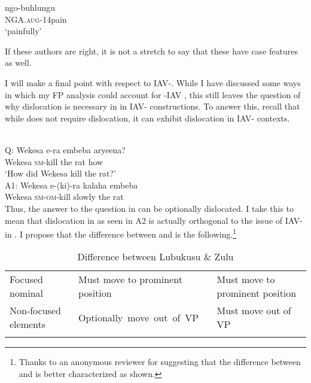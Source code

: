 \documentclass[output=paper,newtxmath,modfonts,nonflat,hidelinks]{langsci/langscibook}
\begin{document}
\ex\label{ex:selvanathan:17b}
\gll ngo-buhlungu\\
NGA.\textsc{aug}{}-14pain\\
\glt `painfully'
\z
\z

If these authors are right, it is not a stretch to say that these have case features as well. 

I will make a final point with respect to  IAV-. While I have discussed some ways in which my FP analysis could account for -IAV , this still leaves the question of why dislocation is necessary in  in IAV- constructions. To answer this, recall that while  does not require dislocation, it can exhibit dislocation in IAV- contexts.

\newpage 
\ea\label{ex:selvanathan:18}
\\
Q: \gll Wekesa    e-ra   embeba   aryeena? \\
Wekesa   \textsc{sm}{}-kill   {the rat}    how \\
\glt \-\hspace{.5cm}`How did Wekesa kill the rat?' \\

A1:
{\gll Wekesa    e-(ki)-ra        kalaha   embeba    \\
Wekesa   \textsc{sm}{}-\textsc{om}{}-kill    slowly  {the rat} \\}
\z
Thus, the answer to the question in  can be optionally dislocated. I take this to mean that dislocation in  as seen in A2 is actually orthogonal to the issue of IAV- in . I propose that the difference between  and  is the following.\footnote{Thanks to an anonymous reviewer for suggesting that the difference between  and  is better characterized as shown.}

\begin{table}
\begin{tabularx}{\textwidth}{@{}lQQ@{}} 
\lsptoprule
&  & \\
\midrule
Focused nominal & Must move to prominent position & Must move to prominent position\\
Non-focused elements & \mbox{Optionally move out of VP} & Must move out of VP\\
\lspbottomrule
\end{tabularx}
\caption{Difference between Lubukusu \& Zulu}
\label{tab:selvanathan:1}
\end{table}
\end{document}
